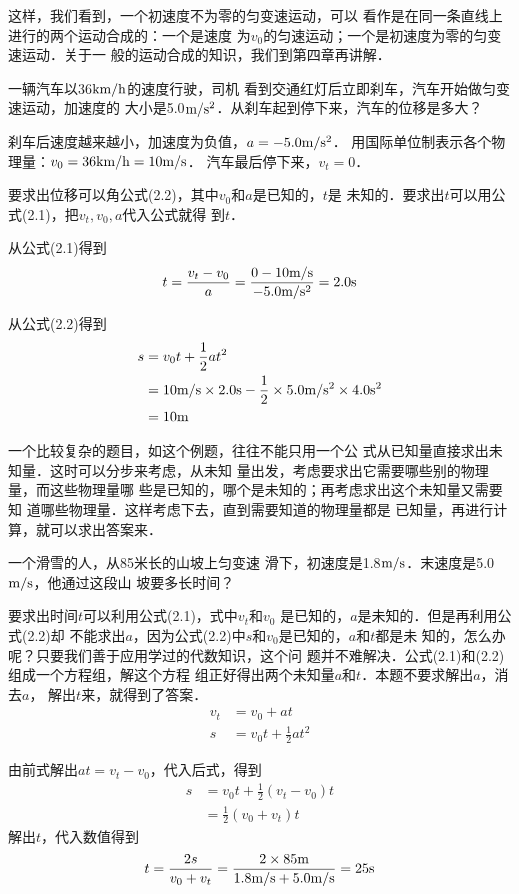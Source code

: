     这样，我们看到，一个初速度不为零的匀变速运动，可以
看作是在同一条直线上进行的两个运动合成的：一个是速度
为$v_0$的匀速运动；一个是初速度为零的匀变速运动．关于一
般的运动合成的知识，我们到第四章再讲解．

\begin{example}
一辆汽车以36$\text{km}/\text{h}$的速度行驶，司机
看到交通红灯后立即刹车，汽车开始做匀变速运动，加速度的
大小是5.0$\text{m}/\text{s}^2$．从刹车起到停下来，汽车的位移是多大？
\end{example}

\begin{solution}
    刹车后速度越来越小，加速度为负值，$a=-5.0\text{m}/\text{s}^2$．
用国际单位制表示各个物理量：$v_0=36\text{km}/\text{h}=10\text{m}/\text{s}$．
汽车最后停下来，$v_t=0$．

    要求出位移可以角公式(2.2)，其中$v_0$和$a$是已知的，$t$是
未知的．要求出$t$可以用公式(2.1)，把$v_t,v_0,a$代入公式就得
到$t$．

从公式(2.1)得到
\[t=\frac{v_t-v_0}{a}=\frac{0-10 \text{m}/\text{s}}{-5.0\text{m}/\text{s}^2}=2.0{\rm s} \]

从公式(2.2)得到
\[\begin{split}
s&=v_0t+\frac{1}{2}at^2\\
&=10\text{m}/\text{s} \times 2.0{\rm s}-\frac{1}{2}\times 5.0\text{m}/\text{s}^2 \times 4.0{\rm s}^2\\
&=10{\rm m}
\end{split} \]


\end{solution}

    一个比较复杂的题目，如这个例题，往往不能只用一个公
式从已知量直接求出未知量．这时可以分步来考虑，从未知
量出发，考虑要求出它需要哪些别的物理量，而这些物理量哪
些是已知的，哪个是未知的；再考虑求出这个未知量又需要知
道哪些物理量．这样考虑下去，直到需要知道的物理量都是
已知量，再进行计算，就可以求出答案来．

\begin{example}
一个滑雪的人，从85米长的山坡上匀变速
滑下，初速度是1.8$\text{m}/\text{s}$．末速度是5.0$\text{m}/\text{s}$，他通过这段山
坡要多长时间？
\end{example}

\begin{solution}
    要求出时间$t$可以利用公式(2.1)，式中$v_t$和$v_0$
是已知的，$a$是未知的．但是再利用公式(2.2)却
不能求出$a$，因为公式(2.2)中$s$和$v_0$是已知的，$a$和$t$都是未
知的，怎么办呢？只要我们善于应用学过的代数知识，这个问
题并不难解决．公式(2.1)和(2.2)组成一个方程组，解这个方程
组正好得出两个未知量$a$和$t$．本题不要求解出$a$，消去$a$，
解出$t$来，就得到了答案．
\begin{align*}
v_t&=v_0+at\\
s&=v_0 t+\frac{1}{2}at^2
\end{align*}

由前式解出$at=v_t-v_0$，代入后式，得到
\[\begin{split}
s&=v_0t+\frac{1}{2}(v_t-v_0)t\\
&=\frac{1}{2}(v_0+v_t)t
\end{split} \]
解出$t$，代入数值得到
\[t=\frac{2s}{v_0+v_t}=\frac{2\times 85{\rm m}}{1.8\text{m}/\text{s}+5.0\text{m}/\text{s}}=25{\rm s} \]
\end{solution}

